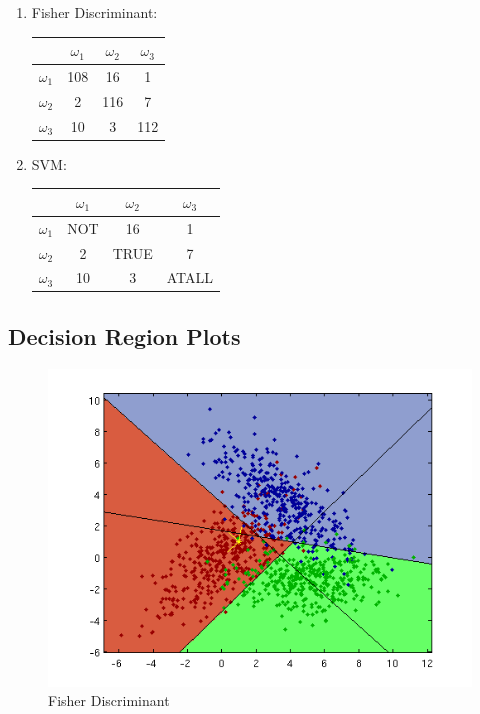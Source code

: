 \documentclass[a4paper]{article}
\begin{document}
\begin{multicols}{2}
\begin{enumerate}
\item Fisher Discriminant:

\begin{tabular}{ | l | c | c | c | }
\hline
& $\omega_1$ & $\omega_2$ & $\omega_3$ \\
\hline
  $\omega_1$ & 108 & 16 & 1 \\
\hline
  $\omega_2$ & 2 & 116 & 7 \\
\hline
  $\omega_3$ & 10 & 3 & 112 \\
\hline
\end{tabular}

\item SVM:

\begin{tabular}{ | l | c | c | c | }
\hline
& $\omega_1$ & $\omega_2$ & $\omega_3$ \\
\hline
  $\omega_1$ & NOT & 16 & 1 \\
\hline
  $\omega_2$ & 2 & TRUE & 7 \\
\hline
  $\omega_3$ & 10 & 3 & ATALL \\
\hline
\end{tabular}

\end{enumerate}
\end{multicols}

\subsection{Decision Region Plots}

\begin{figure}[htbp!]
\center
\includegraphics[clip, trim=40px 15px 30px 10px]{nls_fisher.png}
\caption{Fisher Discriminant}
\end{figure}
\end{document}
